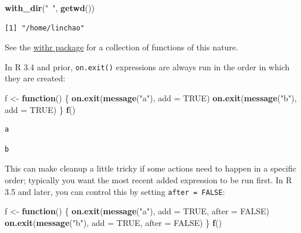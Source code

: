 \documentclass[]{book}
\newenvironment{Shaded}{\begin{snugshade}}{\end{snugshade}}
\newcommand{\ControlFlowTok}[1]{\textcolor[rgb]{0.13,0.29,0.53}{\textbf{#1}}}
\newcommand{\DataTypeTok}[1]{\textcolor[rgb]{0.13,0.29,0.53}{#1}}
\newcommand{\KeywordTok}[1]{\textcolor[rgb]{0.13,0.29,0.53}{\textbf{#1}}}
\newcommand{\NormalTok}[1]{#1}
\newcommand{\OtherTok}[1]{\textcolor[rgb]{0.56,0.35,0.01}{#1}}
\newcommand{\StringTok}[1]{\textcolor[rgb]{0.31,0.60,0.02}{#1}}
\theoremstyle{definition}
\theoremstyle{definition}
\theoremstyle{definition}
\theoremstyle{remark}
\begin{document}
\begin{Shaded}
\begin{Highlighting}[]
\KeywordTok{with_dir}\NormalTok{(}\StringTok{"~"}\NormalTok{, }\KeywordTok{getwd}\NormalTok{())}
\end{Highlighting}
\end{Shaded}

\begin{verbatim}
[1] "/home/linchao"
\end{verbatim}

See the \href{http://withr.r-lib.org}{withr package} for a collection of
functions of this nature.

In R 3.4 and prior, \texttt{on.exit()} expressions are always run in the
order in which they are created:

\begin{Shaded}
\begin{Highlighting}[]
\NormalTok{f <-}\StringTok{ }\ControlFlowTok{function}\NormalTok{() \{}
  \KeywordTok{on.exit}\NormalTok{(}\KeywordTok{message}\NormalTok{(}\StringTok{"a"}\NormalTok{), }\DataTypeTok{add =} \OtherTok{TRUE}\NormalTok{)}
  \KeywordTok{on.exit}\NormalTok{(}\KeywordTok{message}\NormalTok{(}\StringTok{"b"}\NormalTok{), }\DataTypeTok{add =} \OtherTok{TRUE}\NormalTok{)}
\NormalTok{\}}
\KeywordTok{f}\NormalTok{()}
\end{Highlighting}
\end{Shaded}

\begin{verbatim}
a
\end{verbatim}

\begin{verbatim}
b
\end{verbatim}

This can make cleanup a little tricky if some actions need to happen in
a specific order; typically you want the most recent added expression to
be run first. In R 3.5 and later, you can control this by setting
\texttt{after\ =\ FALSE}:

\begin{Shaded}
\begin{Highlighting}[]
\NormalTok{f <-}\StringTok{ }\ControlFlowTok{function}\NormalTok{() \{}
  \KeywordTok{on.exit}\NormalTok{(}\KeywordTok{message}\NormalTok{(}\StringTok{"a"}\NormalTok{), }\DataTypeTok{add =} \OtherTok{TRUE}\NormalTok{, }\DataTypeTok{after =} \OtherTok{FALSE}\NormalTok{)}
  \KeywordTok{on.exit}\NormalTok{(}\KeywordTok{message}\NormalTok{(}\StringTok{"b"}\NormalTok{), }\DataTypeTok{add =} \OtherTok{TRUE}\NormalTok{, }\DataTypeTok{after =} \OtherTok{FALSE}\NormalTok{)}
\NormalTok{\}}
\KeywordTok{f}\NormalTok{()}
\end{Highlighting}
\end{Shaded}
\end{document}
